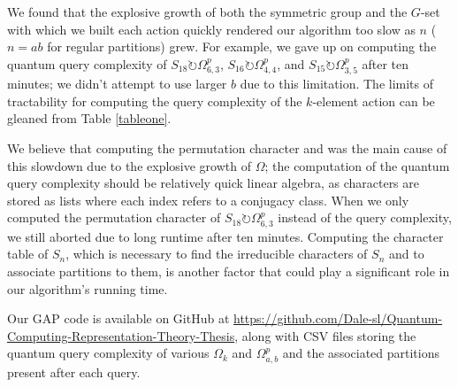 \documentclass[12pt,twoside]{reedthesis}
\theoremstyle{plain}   %
\theoremstyle{definition}
\theoremstyle{remark}
\numberwithin{equation}{section}
\def\acts{\circlearrowright} %
\begin{document}
  
  We found that the explosive growth of both the symmetric group and the $G$-set with which we built each action quickly rendered our algorithm too slow as $n$ ($n=ab$ for regular partitions) grew.
  For example, we gave up on computing the quantum query complexity of $S_{18} \acts \Omega^p_{6,3}$, $S_{16} \acts \Omega^p_{4,4}$, and $S_{15} \acts \Omega^p_{3,5}$ after ten minutes;
  we didn't attempt to use larger $b$ due to this limitation.
  The limits of tractability for computing the query complexity of the $k$-element action can be gleaned from Table \ref{tableone}.


  We believe that computing the permutation character and was the main cause of this slowdown due to the explosive growth of $\Omega$; the computation of the quantum query complexity should be relatively quick linear algebra,
  as characters are stored as lists where each index refers to a conjugacy class.
  When we only computed the permutation character of $S_{18} \acts \Omega^p_{6,3}$ instead of the query complexity, we still aborted due to long runtime after ten minutes.
  Computing the character table of $S_n$, which is necessary to find the irreducible characters of $S_n$ and to associate partitions to them, is another factor that could play a significant role in our algorithm's running time.

  
  Our GAP code is available on GitHub at \url{https://github.com/Dale-sl/Quantum-Computing-Representation-Theory-Thesis}, along with CSV files storing the quantum query complexity of various $\Omega_k$ and $\Omega^p_{a,b}$
  and the associated partitions present after each query.
  
  
\end{document}
